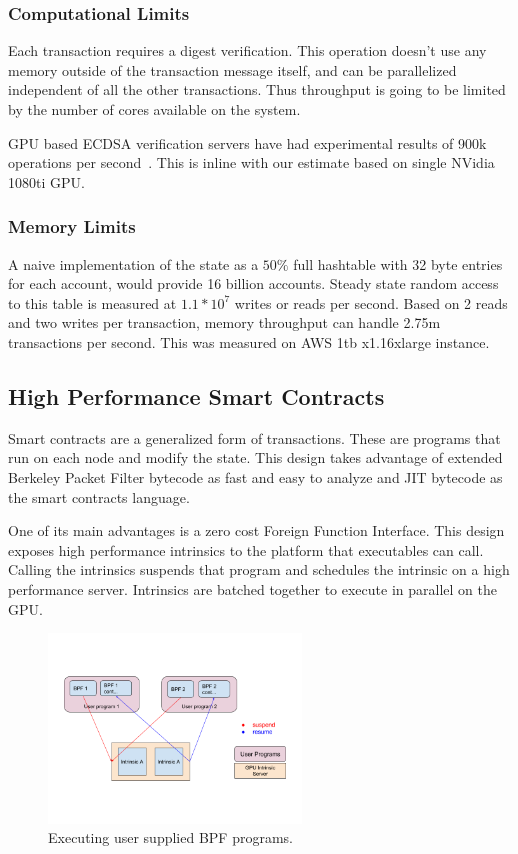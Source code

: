 \documentclass[12pt]{article}
\begin{document}
\subsubsection{Computational Limits}
Each transaction requires a digest verification. This operation doesn’t use any memory outside of the transaction message itself, and can be parallelized independent of all the other transactions. Thus throughput is going to be limited by the number of cores available on the system.

GPU based ECDSA verification servers have had experimental results of 900k operations per second~\cite{gpuecc}. This is inline with our estimate based on single NVidia 1080ti GPU. 
\subsubsection{Memory Limits}
A naive implementation of the state as a \(50\%\) full hashtable with 32 byte entries for each account, would provide 16 billion accounts. Steady state random access to this table is measured at \(1.1 * 10^7\) writes or reads per second. Based on 2 reads and two writes per transaction, memory throughput can handle 2.75m transactions per second. This was measured on AWS 1tb x1.16xlarge instance.

\subsection{High Performance Smart Contracts}\label{sec:smartcontracts}

Smart contracts are a generalized form of transactions. These are programs that run on each node and modify the state. This design takes advantage of extended Berkeley Packet Filter bytecode as fast and easy to analyze and JIT bytecode as the smart contracts language.

One of its main advantages is a zero cost Foreign Function Interface. This design exposes high performance intrinsics to the platform that executables can call. Calling the intrinsics suspends that program and schedules the intrinsic on a high performance server. Intrinsics are batched together to execute in parallel on the GPU.

\begin{figure}
  \begin{center}
    \centering
    \includegraphics[width=0.6\textwidth]{figures/fig_11.png}
    \caption[Fig 11]{Executing user supplied BPF programs.\label{fig_11}}
  \end{center}
  \end{figure}
\end{document}
